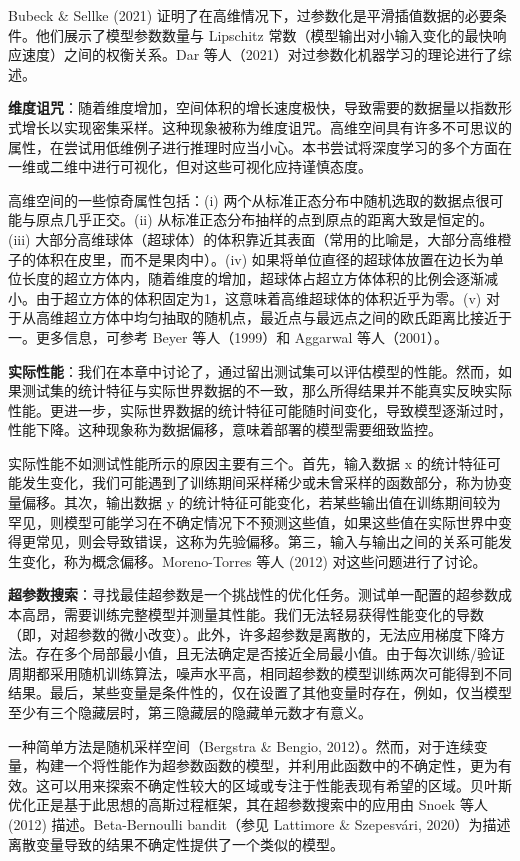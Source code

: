 Bubeck \& Sellke (2021) 证明了在高维情况下，过参数化是平滑插值数据的必要条件。他们展示了模型参数数量与 Lipschitz 常数（模型输出对小输入变化的最快响应速度）之间的权衡关系。Dar 等人（2021）对过参数化机器学习的理论进行了综述。

\textbf{维度诅咒}：随着维度增加，空间体积的增长速度极快，导致需要的数据量以指数形式增长以实现密集采样。这种现象被称为维度诅咒。高维空间具有许多不可思议的属性，在尝试用低维例子进行推理时应当小心。本书尝试将深度学习的多个方面在一维或二维中进行可视化，但对这些可视化应持谨慎态度。

高维空间的一些惊奇属性包括：(i) 两个从标准正态分布中随机选取的数据点很可能与原点几乎正交。(ii) 从标准正态分布抽样的点到原点的距离大致是恒定的。(iii) 大部分高维球体（超球体）的体积靠近其表面（常用的比喻是，大部分高维橙子的体积在皮里，而不是果肉中）。(iv) 如果将单位直径的超球体放置在边长为单位长度的超立方体内，随着维度的增加，超球体占超立方体体积的比例会逐渐减小。由于超立方体的体积固定为1，这意味着高维超球体的体积近乎为零。(v) 对于从高维超立方体中均匀抽取的随机点，最近点与最远点之间的欧氏距离比接近于一。更多信息，可参考 Beyer 等人（1999）和 Aggarwal 等人（2001）。

\textbf{实际性能}：我们在本章中讨论了，通过留出测试集可以评估模型的性能。然而，如果测试集的统计特征与实际世界数据的不一致，那么所得结果并不能真实反映实际性能。更进一步，实际世界数据的统计特征可能随时间变化，导致模型逐渐过时，性能下降。这种现象称为数据偏移，意味着部署的模型需要细致监控。

实际性能不如测试性能所示的原因主要有三个。首先，输入数据 x 的统计特征可能发生变化，我们可能遇到了训练期间采样稀少或未曾采样的函数部分，称为协变量偏移。其次，输出数据 y 的统计特征可能变化，若某些输出值在训练期间较为罕见，则模型可能学习在不确定情况下不预测这些值，如果这些值在实际世界中变得更常见，则会导致错误，这称为先验偏移。第三，输入与输出之间的关系可能发生变化，称为概念偏移。Moreno-Torres 等人 (2012) 对这些问题进行了讨论。

\textbf{超参数搜索}：寻找最佳超参数是一个挑战性的优化任务。测试单一配置的超参数成本高昂，需要训练完整模型并测量其性能。我们无法轻易获得性能变化的导数（即，对超参数的微小改变）。此外，许多超参数是离散的，无法应用梯度下降方法。存在多个局部最小值，且无法确定是否接近全局最小值。由于每次训练/验证周期都采用随机训练算法，噪声水平高，相同超参数的模型训练两次可能得到不同结果。最后，某些变量是条件性的，仅在设置了其他变量时存在，例如，仅当模型至少有三个隐藏层时，第三隐藏层的隐藏单元数才有意义。

一种简单方法是随机采样空间（Bergstra \& Bengio, 2012）。然而，对于连续变量，构建一个将性能作为超参数函数的模型，并利用此函数中的不确定性，更为有效。这可以用来探索不确定性较大的区域或专注于性能表现有希望的区域。贝叶斯优化正是基于此思想的高斯过程框架，其在超参数搜索中的应用由 Snoek 等人 (2012) 描述。Beta-Bernoulli bandit（参见 Lattimore \& Szepesvári, 2020）为描述离散变量导致的结果不确定性提供了一个类似的模型。

